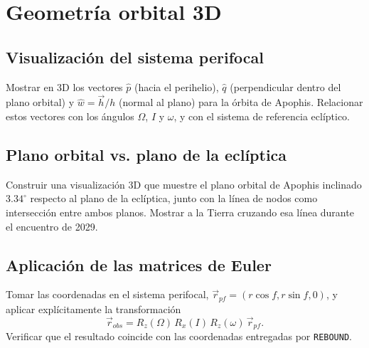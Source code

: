 \section{Geometría orbital 3D}

\subsection{Visualización del sistema perifocal}

Mostrar en 3D los vectores $\hat{p}$ (hacia el perihelio), $\hat{q}$ (perpendicular dentro del plano orbital) y $\hat{w} = \vec{h}/h$ (normal al plano) para la órbita de Apophis. Relacionar estos vectores con los ángulos $\Omega$, $I$ y $\omega$, y con el sistema de referencia eclíptico.

\subsection{Plano orbital vs. plano de la eclíptica}

Construir una visualización 3D que muestre el plano orbital de Apophis inclinado $3.34^{\circ}$ respecto al plano de la eclíptica, junto con la línea de nodos como intersección entre ambos planos. Mostrar a la Tierra cruzando esa línea durante el encuentro de 2029.

\subsection{Aplicación de las matrices de Euler}

Tomar las coordenadas en el sistema perifocal, $\vec{r}_{pf} = (r \cos f, r \sin f, 0)$, y aplicar explícitamente la transformación
\[
\vec{r}_{obs} = R_z(\Omega)\, R_x(I)\, R_z(\omega)\, \vec{r}_{pf}.
\]
Verificar que el resultado coincide con las coordenadas entregadas por \texttt{REBOUND}.